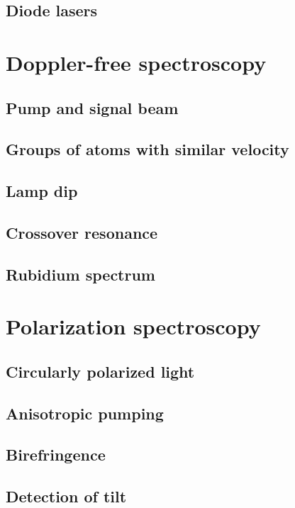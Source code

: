 \documentclass[11pt, english, fleqn, DIV=15, headinclude, BCOR=2cm]{scrreprt}
\begin{document}
\subsection{Diode lasers}

\section{Doppler-free spectroscopy}

\subsection{Pump and signal beam}

\subsection{Groups of atoms with similar velocity}

\subsection{Lamp dip}

\subsection{Crossover resonance}

\subsection{Rubidium spectrum}

\section{Polarization spectroscopy}

\subsection{Circularly polarized light}

\subsection{Anisotropic pumping}

\subsection{Birefringence}

\subsection{Detection of tilt}
\end{document}
